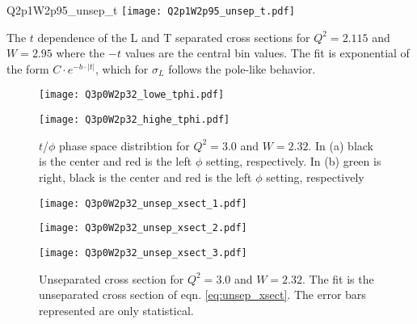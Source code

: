 \begin{Mfigure}{Q2p1W2p95_unsep_t}
  \centering
  \texttt{[image: Q2p1W2p95\_unsep\_t.pdf]}
  \caption{The $t$ dependence of the L and T separated cross sections for $Q^2=2.115$ and $W=2.95$ where the $-t$ values are the central bin values. The fit is exponential of the form $C\cdot e^{-b\cdot|t|}$, which for $\sigma_L$ follows the pole-like behavior.}
  \label{fig:Q2p1W2p95_unsep_t}
\end{Mfigure}

\clearpage


\begin{figure}
  \centering
  \begin{minipage}[b]{0.48\linewidth}
    \texttt{[image: Q3p0W2p32\_lowe\_tphi.pdf]}
  \end{minipage}
  \hfill
  \begin{minipage}[b]{0.48\linewidth}
    \texttt{[image: Q3p0W2p32\_highe\_tphi.pdf]}
  \end{minipage}  
  \caption{$t$/$\phi$ phase space distribtion for $Q^2=3.0$ and $W=2.32$. In (a) black is the center and red is the left $\phi$ setting, respectively. In (b) green is right, black is the center and red is the left $\phi$ setting, respectively}
  \label{fig:Q3p0W2p32_tphi}
\end{figure}

\begin{figure}
  \centering
  \begin{minipage}[b]{0.48\linewidth}
    \texttt{[image: Q3p0W2p32\_unsep\_xsect\_1.pdf]}
  \end{minipage}
  \hfill
  \begin{minipage}[b]{0.48\linewidth}
    \texttt{[image: Q3p0W2p32\_unsep\_xsect\_2.pdf]}
  \end{minipage}
  \begin{minipage}[b]{0.48\linewidth}
    \texttt{[image: Q3p0W2p32\_unsep\_xsect\_3.pdf]}
  \end{minipage}  
  \caption{Unseparated cross section for $Q^2=3.0$ and $W=2.32$. The fit is the unseparated cross section of eqn. \ref{eq:unsep_xsect}. The error bars represented are only statistical.}
  \label{fig:Q3p0W2p32_unsep_xsect}
\end{figure}

